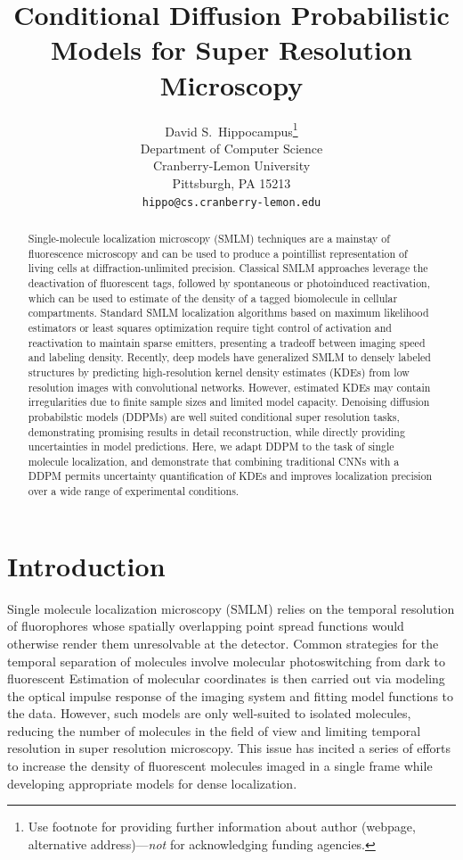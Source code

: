\documentclass{article}
\title{Conditional Diffusion Probabilistic Models for Super Resolution Microscopy}
\author{%
  David S.~Hippocampus\thanks{Use footnote for providing further information
    about author (webpage, alternative address)---\emph{not} for acknowledging
    funding agencies.} \\
  Department of Computer Science\\
  Cranberry-Lemon University\\
  Pittsburgh, PA 15213 \\
  \texttt{hippo@cs.cranberry-lemon.edu} \\
}
\begin{document}
\maketitle


\begin{abstract}
Single-molecule localization microscopy (SMLM) techniques are a mainstay of fluorescence microscopy and can be used to produce a pointillist representation of living cells at diffraction-unlimited precision. Classical SMLM approaches leverage the deactivation of fluorescent tags, followed by spontaneous or photoinduced reactivation, which can be used to estimate of the density of a tagged biomolecule in cellular compartments. Standard SMLM localization algorithms based on maximum likelihood estimators or least squares optimization require tight control of activation and reactivation to maintain sparse emitters, presenting a tradeoff between imaging speed and labeling density. Recently, deep models have generalized SMLM to densely labeled structures by predicting high-resolution kernel density estimates (KDEs) from low resolution images with convolutional networks. However, estimated KDEs may contain irregularities due to finite sample sizes and limited model capacity. Denoising diffusion probabilstic models (DDPMs) are well suited conditional super resolution tasks, demonstrating promising results in detail reconstruction, while directly providing uncertainties in model predictions. Here, we adapt DDPM to the task of single molecule localization, and demonstrate that combining traditional CNNs with a DDPM permits uncertainty quantification of KDEs and improves localization precision over a wide range of experimental conditions.
\end{abstract}

\section{Introduction}

Single molecule localization microscopy (SMLM) relies on the temporal resolution of fluorophores whose spatially overlapping point spread functions would otherwise render them unresolvable at the detector. Common strategies for the temporal separation of molecules involve molecular photoswitching from dark to fluorescent Estimation of molecular coordinates is then carried out via modeling the optical impulse response of the imaging system and fitting model functions to the data. However, such models are only well-suited to isolated molecules, reducing the number of molecules in the field of view and limiting temporal resolution in super resolution microscopy. This issue has incited a series of efforts to increase the density of fluorescent molecules imaged in a single frame while developing appropriate models for dense localization.
\end{document}
